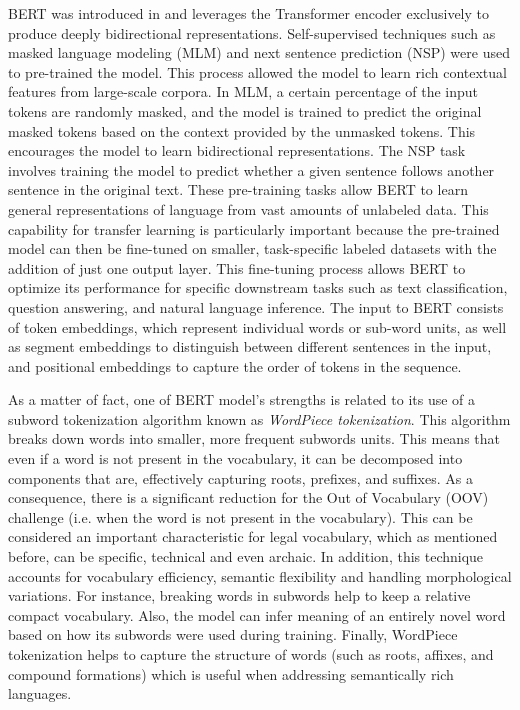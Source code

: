 \documentclass[onecolumn, journal, english, 12pt, a4paper]{IEEEtran} %
\theoremstyle{definition}
\begin{document}
BERT was introduced in \cite{devlin2018bert} and leverages the
Transformer encoder exclusively to produce deeply bidirectional
representations. Self-supervised techniques such as masked language
modeling (MLM) and next sentence prediction (NSP) were used to
pre-trained the model. This process allowed the model to learn rich
contextual features from large-scale corpora. In MLM, a certain
percentage of the input tokens are randomly masked, and the model is
trained to predict the original masked tokens based on the context
provided by the unmasked tokens. This encourages the model to learn
bidirectional representations. The NSP task involves training the
model to predict whether a given sentence follows another sentence in
the original text. These pre-training tasks allow BERT to learn
general representations of language from vast amounts of unlabeled
data. This capability for transfer learning is particularly important
because the pre-trained model can then be fine-tuned on smaller,
task-specific labeled datasets with the addition of just one output
layer. This fine-tuning process allows BERT to optimize its
performance for specific downstream tasks such as text classification,
question answering, and natural language inference. The input to BERT
consists of token embeddings, which represent individual words or
sub-word units, as well as segment embeddings to distinguish between
different sentences in the input, and positional embeddings to capture
the order of tokens in the sequence.

As a matter of fact, one of BERT model's strengths is related to its
use of a subword tokenization algorithm known as \textit{WordPiece
  tokenization}. This algorithm breaks down words into smaller, more
frequent subwords units. This means that even if a word is not present
in the vocabulary, it can be decomposed into components that are,
effectively capturing roots, prefixes, and suffixes. As a consequence,
there is a significant reduction for the Out of Vocabulary (OOV)
challenge (i.e. when the word is not present in the vocabulary). This
can be considered an important characteristic for legal vocabulary,
which as mentioned before, can be specific, technical and even
archaic. In addition, this technique accounts for vocabulary
efficiency, semantic flexibility and handling morphological
variations. For instance, breaking words in subwords help to keep a
relative compact vocabulary. Also, the model can infer meaning of an
entirely novel word based on how its subwords were used during
training. Finally, WordPiece tokenization helps to capture the
structure of words (such as roots, affixes, and compound formations)
which is useful when addressing semantically rich languages.
\end{document}
